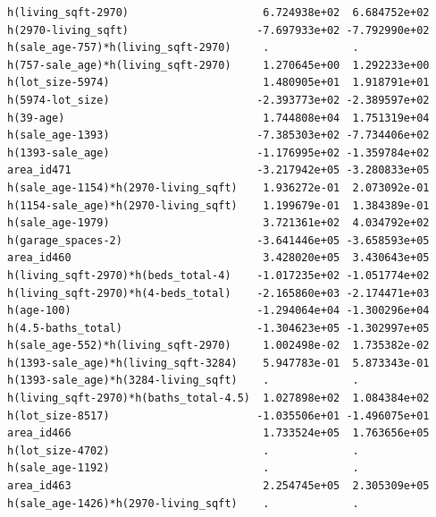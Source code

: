 \documentclass[
]{article}
\begin{document}
\begin{verbatim}
h(living_sqft-2970)                     6.724938e+02  6.684752e+02
h(2970-living_sqft)                    -7.697933e+02 -7.792990e+02
h(sale_age-757)*h(living_sqft-2970)     .             .           
h(757-sale_age)*h(living_sqft-2970)     1.270645e+00  1.292233e+00
h(lot_size-5974)                        1.480905e+01  1.918791e+01
h(5974-lot_size)                       -2.393773e+02 -2.389597e+02
h(39-age)                               1.744808e+04  1.751319e+04
h(sale_age-1393)                       -7.385303e+02 -7.734406e+02
h(1393-sale_age)                       -1.176995e+02 -1.359784e+02
area_id471                             -3.217942e+05 -3.280833e+05
h(sale_age-1154)*h(2970-living_sqft)    1.936272e-01  2.073092e-01
h(1154-sale_age)*h(2970-living_sqft)    1.199679e-01  1.384389e-01
h(sale_age-1979)                        3.721361e+02  4.034792e+02
h(garage_spaces-2)                     -3.641446e+05 -3.658593e+05
area_id460                              3.428020e+05  3.430643e+05
h(living_sqft-2970)*h(beds_total-4)    -1.017235e+02 -1.051774e+02
h(living_sqft-2970)*h(4-beds_total)    -2.165860e+03 -2.174471e+03
h(age-100)                             -1.294064e+04 -1.300296e+04
h(4.5-baths_total)                     -1.304623e+05 -1.302997e+05
h(sale_age-552)*h(living_sqft-2970)     1.002498e-02  1.735382e-02
h(1393-sale_age)*h(living_sqft-3284)    5.947783e-01  5.873343e-01
h(1393-sale_age)*h(3284-living_sqft)    .             .           
h(living_sqft-2970)*h(baths_total-4.5)  1.027898e+02  1.084384e+02
h(lot_size-8517)                       -1.035506e+01 -1.496075e+01
area_id466                              1.733524e+05  1.763656e+05
h(lot_size-4702)                        .             .           
h(sale_age-1192)                        .             .           
area_id463                              2.254745e+05  2.305309e+05
h(sale_age-1426)*h(2970-living_sqft)    .             .           
                                                                  

\end{verbatim}
\end{document}
